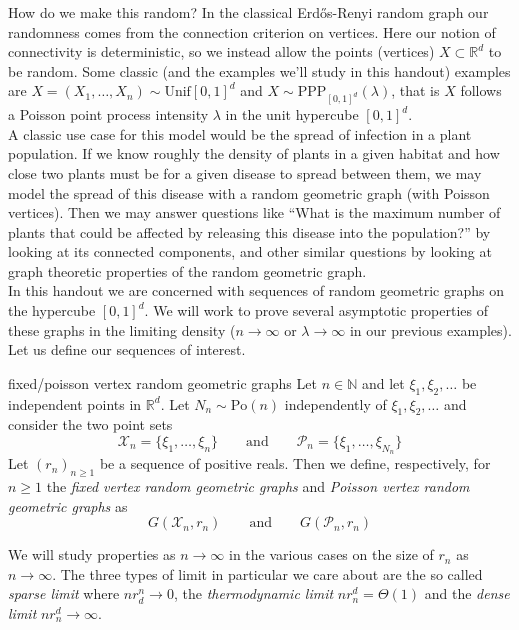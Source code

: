 \documentclass{article}
\begin{document}
How do we make this random? In the classical Erd\H{o}s-Renyi random graph our randomness comes from the 
connection criterion on vertices. Here our notion of connectivity is deterministic, so we instead allow the 
points (vertices) $X \subset \mathbb{R}^d$ to be random. Some classic (and the examples we'll study in this 
handout) examples are $X = (X_1, \dots, X_n) \sim \text{Unif}[0,1]^d$ and $X \sim \text{PPP}_{[0,1]^d}(\lambda)$, 
that is $X$ follows a Poisson point process intensity $\lambda$ in the unit hypercube $[0,1]^d$. \\

A classic use case for this model would be the spread of infection in a plant population. If we know roughly 
the density of plants in a given habitat and how close two plants must be for a given disease to spread between 
them, we may model the spread of this disease with a random geometric graph (with Poisson vertices). Then we may 
answer questions like ``What is the maximum number of plants that could be affected by releasing this disease into 
the population?'' by looking at its connected components, and other similar questions by looking at 
graph theoretic properties of the random geometric graph. \\ 

In this handout we are concerned with sequences of random geometric graphs on the hypercube $[0,1]^d$. We will 
work to prove several asymptotic properties of these graphs in the limiting density ($n \to \infty$ or $\lambda 
\to \infty$ in our previous examples). Let us define our sequences of interest. 

\begin{definition}[]{fixed/poisson vertex random geometric graphs}
    Let $n \in \mathbb{N}$ and let $\xi_1, \xi_2, \dots$ be independent points in $\mathbb{R}^d$. Let $N_n \sim \text{Po}(n)$ 
    independently of $\xi_1, \xi_2, \dots$ and consider the two point sets 
    \[\mathcal{X}_n = \{\xi_1, \dots, \xi_n\} \qquad \text{and} \qquad \mathcal{P}_n = \{\xi_1, \dots, \xi_{N_n}\}\]
    Let $(r_n)_{n \geq 1}$ be a sequence of positive reals. Then we define, respectively, for $n \geq 1$ the
    {\it fixed vertex random geometric graphs} and {\it Poisson vertex random geometric graphs} as 
    \[G(\mathcal{X}_n, r_n) \qquad \text{and} \qquad G(\mathcal{P}_n, r_n)\]
\end{definition}

We will study properties as $n \to \infty$ in the various cases on the size of $r_n$ as $n \to \infty$. The three 
types of limit in particular we care about are the so called {\it sparse limit} where $nr_d^n \to 0$, the 
{\it thermodynamic limit} $nr_n^d = \Theta(1)$ and the {\it dense limit} $nr_n^d \to \infty$. \\ 
\end{document}
